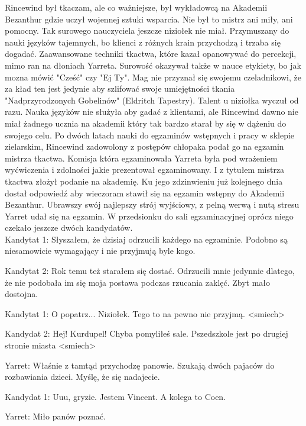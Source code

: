 \documentclass{article}
\begin{document}
    Rincewind był tkaczam, ale co ważniejsze, był wykładowcą na Akademii Bezanthur gdzie uczył wojennej sztuki wsparcia. Nie był to mistrz ani miły, ani pomocny. Tak surowego nauczyciela jeszcze niziołek nie miał. Przymuszany do nauki języków tajemnych, bo klienci z różnych krain przychodzą i trzaba się dogadać. Zaawansowane techniki tkactwa, które kazał opanowywać do percekcji, mimo ran na dłoniach Yarreta. Surowość okazywał także w nauce etykiety, bo jak mozna mówić "Cześć" czy "Ej Ty". Mag nie przyznał się swojemu czeladnikowi, że za
    kład ten jest jedynie aby szlifować swoje umiejętności tkania "Nadprzyrodzonych Gobelinów" (Eldritch Tapestry). Talent u niziołka wyczuł od razu. Nauka języków nie służyła aby gadać z klientami, ale Rincewind dawno nie miał żadnego ucznia na akademii który tak bardzo starał by się w dążeniu do swojego celu. Po dwóch latach nauki do egzaminów wstępnych i pracy w sklepie zielarskim, Rincewind zadowolony z postępów chłopaka podał go na egzamin mistrza tkactwa. Komisja która egzaminowała Yarreta była pod wrażeniem wyćwiczenia i zdolności jakie prezentował egzaminowany. I z tytułem mistrza tkactwa złożył podanie na akademię. Ku jego zdzinwieniu już kolejnego dnia dostał odpowiedź aby wieczoram stawił się na egzamin wstępny do Akademii Bezanthur. Ubrawszy swój najlepszy strój wyjściowy, z pelną werwą i nutą stresu Yarret udał się na egzamin. W przedsionku do sali egzaminacyjnej oprócz niego czekało jeszcze dwóch kandydatów.\\

    Kandytat 1: Słyszałem, że dzisiaj odrzucili każdego na egzaminie. Podobno są niesamowicie wymagający i nie przyjmują byle kogo.

    Kandytat 2: Rok temu też starałem się dostać. Odrzucili mnie jedynnie dlatego, że nie podobała im się moja postawa podczas rzucania zaklęć. Zbyt mało dostojna.

    Kandytat 1: O popatrz... Niziołek. Tego to na pewno nie przyjmą. <smiech>

    Kandydat 2: Hej! Kurdupel! Chyba pomyliłeś sale. Pszedszkole jest po drugiej stronie miasta <smiech>

    Yarret: Właśnie z tamtąd przychodzę panowie. Szukają dwóch pajaców do rozbawiania dzieci. Myślę, że się nadajecie.

    Kandydat 1: Uuu, gryzie. Jestem Vincent. A kolega to Coen.

    Yarret: Miło panów poznać.\\
\end{document}
